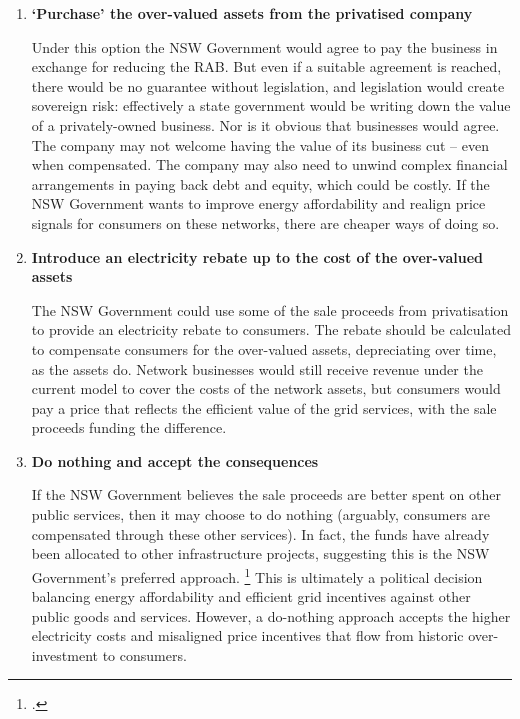 \documentclass[FrontPage]{grattan}
\begin{document}
\begin{enumerate}

 \item \textbf{`Purchase' the over-valued assets from the privatised company}
 
Under this option the NSW Government would agree to pay the business in exchange for reducing the RAB\@. But even if a suitable agreement is reached, there would be no guarantee without legislation, and legislation would create sovereign risk: effectively a state government would be writing down the value of a privately-owned business. Nor is it obvious that businesses would agree. The company may not welcome having the value of its business cut -- even when compensated. The company may also need to unwind complex financial arrangements in paying back debt and equity, which could be costly. If the NSW Government wants to improve energy affordability and realign price signals for consumers on these networks, there are cheaper ways of doing so. 
 
 \item \textbf{Introduce an electricity rebate up to the cost of the over-valued assets}
 
The NSW Government could use some of the sale proceeds from privatisation to provide an electricity rebate to consumers. The rebate should be calculated to compensate consumers for the over-valued assets, depreciating over time, as the assets do. Network businesses would still receive revenue under the current model to cover the costs of the network assets, but consumers would pay a price that reflects the efficient value of the grid services, with the sale proceeds funding the difference. 

 \item \textbf{Do nothing and accept the consequences}

If the NSW Government believes the sale proceeds are better spent on other public services, then it may choose to do nothing (arguably, consumers are compensated through these other services). In fact, the funds have already been allocated to other infrastructure projects, suggesting this is the NSW Government's preferred approach.%
\footcite{InfrastructureNSW2017RestartNSW}
This is ultimately a political decision balancing energy affordability and efficient grid incentives against other public goods and services. However, a do-nothing approach accepts the higher electricity costs and misaligned price incentives that flow from historic over-investment to consumers.

\end{enumerate}
\end{document}
